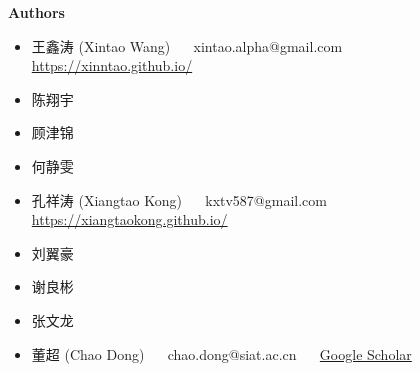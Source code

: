 \documentclass[../main.tex]{subfiles}
\begin{document}
\newpage

{\Large\textbf{Authors}}

\begin{itemize}
    \item 王鑫涛 (Xintao Wang) ~~ xintao.alpha@gmail.com ~~ \url{https://xinntao.github.io/}
    \item 陈翔宇
    \item 顾津锦
    \item 何静雯
    \item 孔祥涛 (Xiangtao Kong) ~~ kxtv587@gmail.com ~~ \url{https://xiangtaokong.github.io/}
    \item 刘翼豪
    \item 谢良彬
    \item 张文龙
    \item 董超 (Chao Dong) ~~ chao.dong@siat.ac.cn ~~ \href{https://scholar.google.com.hk/citations?user=OSDCB0UAAAAJ}{Google Scholar}
\end{itemize}
\end{document}
